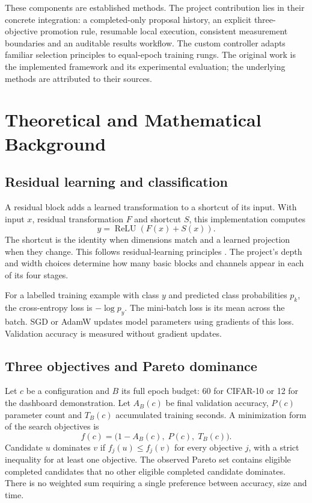 \documentclass[11pt,a4paper,oneside]{report}
\begin{document}
These components are established methods. The project contribution lies in their concrete integration: a completed-only proposal history, an explicit three-objective promotion rule, resumable local execution, consistent measurement boundaries and an auditable results workflow. The custom controller adapts familiar selection principles to equal-epoch training rungs. The original work is the implemented framework and its experimental evaluation; the underlying methods are attributed to their sources.
\chapter{Theoretical and Mathematical Background}
\section{Residual learning and classification}
A residual block adds a learned transformation to a shortcut of its input. With input $x$, residual transformation $F$ and shortcut $S$, this implementation computes
\begin{equation}
 y=\operatorname{ReLU}(F(x)+S(x)).
\end{equation}
The shortcut is the identity when dimensions match and a learned projection when they change. This follows residual-learning principles \cite{resnet}. The project's depth and width choices determine how many basic blocks and channels appear in each of its four stages.

For a labelled training example with class $y$ and predicted class probabilities $p_k$, the cross-entropy loss is $-\log p_y$. The mini-batch loss is its mean across the batch. SGD or AdamW updates model parameters using gradients of this loss. Validation accuracy is measured without gradient updates.

\section{Three objectives and Pareto dominance}
Let $c$ be a configuration and $B$ its full epoch budget: 60 for CIFAR-10 or 12 for the dashboard demonstration. Let $A_B(c)$ be final validation accuracy, $P(c)$ parameter count and $T_B(c)$ accumulated training seconds. A minimization form of the search objectives is
\begin{equation}
 f(c)=\bigl(1-A_B(c),\;P(c),\;T_B(c)\bigr).
\end{equation}
Candidate $u$ dominates $v$ if $f_j(u)\leq f_j(v)$ for every objective $j$, with a strict inequality for at least one objective. The observed Pareto set contains eligible completed candidates that no other eligible completed candidate dominates. There is no weighted sum requiring a single preference between accuracy, size and time.
\end{document}
